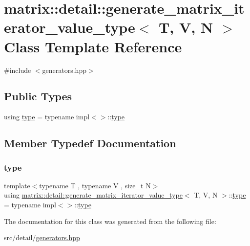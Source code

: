 \hypertarget{classmatrix_1_1detail_1_1generate__matrix__iterator__value__type}{}\section{matrix\+:\+:detail\+:\+:generate\+\_\+matrix\+\_\+iterator\+\_\+value\+\_\+type$<$ T, V, N $>$ Class Template Reference}
\label{classmatrix_1_1detail_1_1generate__matrix__iterator__value__type}


{\ttfamily \#include $<$generators.\+hpp$>$}

\subsection*{Public Types}
\begin{DoxyCompactItemize}
\item 
using \hyperlink{classmatrix_1_1detail_1_1generate__matrix__iterator__value__type_ac43ec224b9b3f41a6c50ba7dee50a9c8}{type} = typename impl$<$$>$\+::\hyperlink{classmatrix_1_1detail_1_1generate__matrix__iterator__value__type_ac43ec224b9b3f41a6c50ba7dee50a9c8}{type}
\end{DoxyCompactItemize}


\subsection{Member Typedef Documentation}
\mbox{\label{classmatrix_1_1detail_1_1generate__matrix__iterator__value__type_ac43ec224b9b3f41a6c50ba7dee50a9c8}} 
\subsubsection{\texorpdfstring{type}{type}}
{\footnotesize\ttfamily template$<$typename T , typename V , size\+\_\+t N$>$ \\
using \hyperlink{classmatrix_1_1detail_1_1generate__matrix__iterator__value__type}{matrix\+::detail\+::generate\+\_\+matrix\+\_\+iterator\+\_\+value\+\_\+type}$<$ T, V, N $>$\+::\hyperlink{classmatrix_1_1detail_1_1generate__matrix__iterator__value__type_ac43ec224b9b3f41a6c50ba7dee50a9c8}{type} =  typename impl$<$$>$\+::\hyperlink{classmatrix_1_1detail_1_1generate__matrix__iterator__value__type_ac43ec224b9b3f41a6c50ba7dee50a9c8}{type}}



The documentation for this class was generated from the following file\+:\begin{DoxyCompactItemize}
\item 
src/detail/\hyperlink{generators_8hpp}{generators.\+hpp}\end{DoxyCompactItemize}

